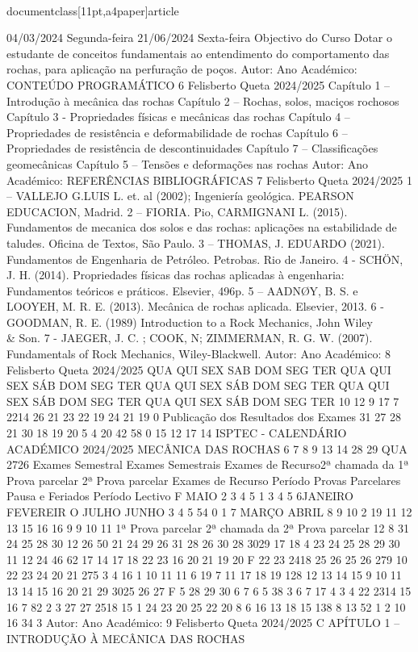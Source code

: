 \\documentclass[11pt,a4paper]{article}
\begin{document}
04/03/2024 Segunda-feira 21/06/2024 Sexta-feira
Objectivo do Curso
Dotar o estudante de conceitos fundamentais ao entendimento do comportamento das
rochas, para aplicação na perfuração de poços.
Autor:
Ano Académico:
CONTEÚDO PROGRAMÁTICO 6
Felisberto Queta
2024/2025
Capítulo 1 – Introdução à mecânica das rochas 
Capítulo 2 – Rochas, solos, maciços rochosos
Capítulo 3 - Propriedades físicas e mecânicas das rochas 
Capítulo 4 – Propriedades de resistência e deformabilidade de rochas
Capítulo 6 – Propriedades de resistência de descontinuidades
Capítulo 7 – Classificações geomecânicas
Capítulo 5 – Tensões e deformações nas rochas
Autor:
Ano Académico:
REFERÊNCIAS BIBLIOGRÁFICAS 7
Felisberto Queta
2024/2025
1 – VALLEJO G.LUIS L. et. al (2002); Ingeniería geológica. PEARSON EDUCACION, Madrid.
2 – FIORIA. Pio, CARMIGNANI L. (2015). Fundamentos de mecanica dos solos e das rochas: 
aplicações na estabilidade de taludes. Oficina de Textos, São Paulo.
3 – THOMAS, J. EDUARDO (2021). Fundamentos de Engenharia de Petróleo. Petrobas. Rio de 
Janeiro.
4 - SCHÖN, J. H. (2014). Propriedades físicas das rochas aplicadas à engenharia: Fundamentos 
teóricos e práticos. Elsevier, 496p.
5 – AADNØY, B. S. e LOOYEH, M. R. E. (2013). Mecânica de rochas aplicada. Elsevier, 2013.
6 - GOODMAN, R. E. (1989) Introduction to a Rock Mechanics, John Wiley \\& Son.
7 - JAEGER, J. C. ; COOK, N; ZIMMERMAN, R. G. W. (2007). Fundamentals of Rock Mechanics, 
Wiley-Blackwell.
Autor:
Ano Académico:
8
Felisberto Queta
2024/2025
QUA QUI SEX SAB DOM SEG TER QUA QUI SEX SÁB DOM SEG TER QUA QUI SEX SÁB DOM SEG TER QUA QUI SEX SÁB DOM SEG TER QUA QUI SEX SÁB DOM SEG TER
10
12
9 17
7 2214
26
21
23
22
19
24
21
19
0
Publicação dos Resultados dos 
Exames
31
27 28
21
30
18 19 20
5
4
20
42
58
0
15
12
17
14
ISPTEC - CALENDÁRIO  ACADÉMICO 2024/2025  MECÂNICA DAS ROCHAS
6 7 8 9 13 14
28 29
QUA
2726
Exames Semestral
Exames Semestrais Exames de Recurso2ª chamada da 1ª Prova parcelar 
2ª Prova parcelar Exames de Recurso
Período Provas Parcelares
Pausa e Feriados
Período Lectivo
F
MAIO
2 3 4 5
1
3 4 5 6JANEIRO
FEVEREIR
O
JULHO
JUNHO
3
4 5
54
0
1
7
MARÇO
ABRIL
8 9 10
2
19
11 12 13
15 16
16
9
9 10 11
1ª Prova parcelar 2ª chamada da 2ª Prova parcelar 
12
8
31
24 25
28 30
12
26
50
21
24 29
26
31
28
26
30
28 3029
17 18
4
23 24 25 28 29 30
11 12
24
46
62
17
14 17 18 22 23
16 20 21
19 20 F 22 23 2418 25 26
25 26 279 10 22 23 24
20 21
275
3 4
16
1 10 11
11
6
19
7
11 17 18 19
128
12 13 14 15
9 10 11 13 14 15 16
20 21
29 3025 26 27
F 5
28 29 30
6 7
6
5
38
3
6 7 17
4
3
4 22 2314 15 16
7 82
2 3
27
27
2518
15
1 24
23
20
25
22
20
8
6
16
13
18
15
138
8
13
52
1 2
10 16
34
3
Autor:
Ano Académico:
9
Felisberto Queta
2024/2025
C
APÍTULO 1 
–
INTRODUÇÃO À MECÂNICA 
DAS ROCHAS\
\end{document}
